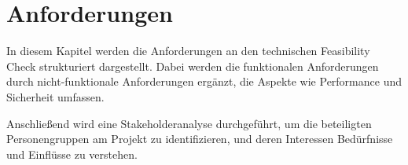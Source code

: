 \chapter{Anforderungen}\label{Chap:Anforderungen}

In diesem Kapitel werden die Anforderungen an den technischen Feasibility Check strukturiert dargestellt. Dabei werden die funktionalen Anforderungen durch nicht-funktionale Anforderungen ergänzt, die Aspekte wie Performance und Sicherheit umfassen.

Anschließend wird eine Stakeholderanalyse durchgeführt, um die beteiligten Personengruppen am Projekt zu identifizieren, und deren Interessen Bedürfnisse und Einflüsse zu verstehen. 









